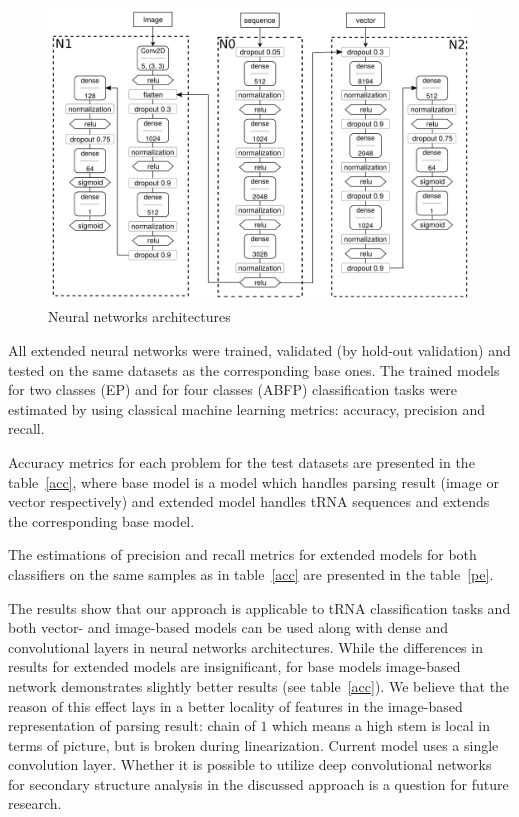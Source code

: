 \documentclass[12pt,a4paper]{cibb}
\begin{document}
\begin{figure}[h]
\begin{center}
\centering
\includegraphics[width=14cm]{nn_arch.pdf}
\caption{Neural networks architectures}
\label{nn}
\end{center}
\end{figure}


All extended neural networks were trained, validated (by hold-out validation) and tested on the same datasets as the corresponding base ones.
The trained models for two classes (EP) and for four classes (ABFP) classification tasks were estimated by using classical machine learning metrics: accuracy, precision and recall.

Accuracy metrics for each problem for the test datasets are presented in the table~\ref{acc}, where base model is a model which handles parsing result (image or vector respectively) and extended model handles tRNA sequences and extends the corresponding base model.



The estimations of precision and recall metrics for extended models for both classifiers on the same  samples as in table~\ref{acc} are presented in the table~\ref{pe}.



The results show that our approach is applicable to tRNA classification tasks and both vector- and image-based models can be used along with dense and convolutional layers in neural networks architectures.
While the differences in results for extended models are insignificant, for base models image-based network demonstrates slightly better results (see table~\ref{acc}).
We believe that the reason of this effect lays in a better locality of features in the image-based representation of parsing result: chain of $1$ which means a high stem is local in terms of picture, but is broken during linearization.
Current model uses a single convolution layer.
Whether it is possible to utilize deep convolutional networks for secondary structure analysis in the discussed approach is a question for future research.
\end{document}

